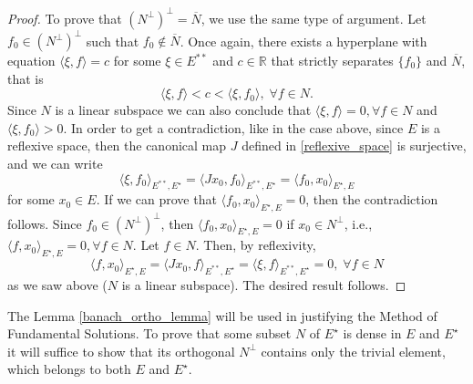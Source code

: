 \begin{proof}
    To prove that \((N^\perp)^\perp = \overline{N}\), we use the same type of argument. Let \(f_0 \in (N^\perp)^\perp\) such that \(f_0 \not \in \overline{N}\). Once again, there exists a hyperplane with equation \(\langle \xi, f \rangle = c\) for some \(\xi \in E^{**}\) and \(c \in \mathbb{R}\) that strictly separates \(\{f_0\}\) and \(\overline{N}\), that is
    \[
        \langle \xi, f \rangle < c < \langle \xi, f_0 \rangle, \; \forall f \in N.
    \]
    Since \(N\) is a linear subspace we can also conclude that \(\langle \xi, f \rangle = 0, \forall f \in N\) and \(\langle \xi, f_0 \rangle > 0\). In order to get a contradiction, like in the case above, since \(E\) is a reflexive space, then the canonical map \(J\) defined in \eqref{reflexive_space} is surjective, and we can write
    \[
        \langle \xi, f_0 \rangle_{E^{**}, E^\star} = \langle J x_0, f_0 \rangle_{E^{**}, E^\star} = \langle f_0, x_0 \rangle_{E^\star, E}
    \]
    for some \(x_0 \in E\). If we can prove that \(\langle f_0, x_0 \rangle_{E^\star, E} = 0\), then the contradiction follows. Since \(f_0 \in (N^\perp)^\perp\), then \(\langle f_0, x_0 \rangle_{E^\star, E} = 0\) if \(x_0 \in N^\perp\), i.e., \(\langle f, x_0 \rangle_{E^\star, E} = 0, \forall f \in N\). Let \(f \in N\). Then, by reflexivity,
    \[
        \langle f, x_0 \rangle_{E^\star, E} = \langle J x_0, f \rangle_{E^{**}, E^\star} = \langle \xi, f \rangle_{E^{**}, E^\star} = 0, \; \forall f \in N
    \]
    as we saw above (\(N\) is a linear subspace).
    The desired result follows.
\end{proof}
\begin{remark}\label{chapt_preliminaries_remark_density_banach}
    The Lemma \ref{banach_ortho_lemma} will be used in justifying the Method of Fundamental Solutions. To prove that some subset \(N\) of \(E ^\star\) is dense in \(E\) and \(E^\star\) it will suffice to show that its orthogonal \(N^\perp\) contains only the trivial element, which belongs to both \(E\) and \(E^\star\).
\end{remark}

